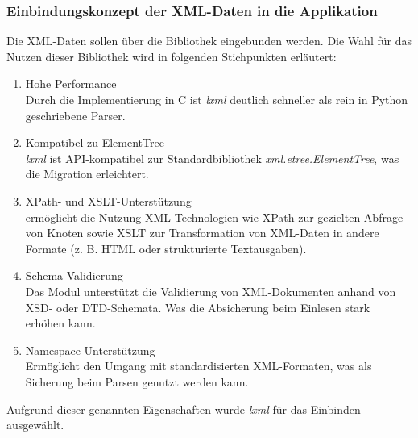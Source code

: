 \subsubsection{Einbindungskonzept der XML-Daten in die Applikation}

Die XML-Daten sollen über die Bibliothek  eingebunden werden.
Die Wahl für das Nutzen dieser Bibliothek wird in folgenden Stichpunkten erläutert: \cite{lxml}

\begin{enumerate}

\item Hohe Performance \\
Durch die Implementierung in C ist \textit{lxml} deutlich schneller als rein in Python geschriebene Parser.

\item Kompatibel zu ElementTree \\
\textit{lxml} ist API-kompatibel zur Standardbibliothek \textit{xml.etree.ElementTree}, was die Migration erleichtert.

\item XPath- und XSLT-Unterstützung \\
 ermöglicht die Nutzung XML-Technologien wie XPath zur gezielten Abfrage von Knoten sowie
XSLT zur Transformation von XML-Daten in andere Formate (z. B. HTML oder strukturierte Textausgaben).

\item Schema-Validierung \\
Das Modul unterstützt die Validierung von XML-Dokumenten anhand von XSD- oder DTD-Schemata.
Was die Absicherung beim Einlesen stark erhöhen kann.

\item Namespace-Unterstützung \\
Ermöglicht den Umgang mit standardisierten XML-Formaten, was als Sicherung beim Parsen genutzt werden kann.

\end{enumerate}

Aufgrund dieser genannten Eigenschaften wurde \textit{lxml} für das Einbinden ausgewählt.





